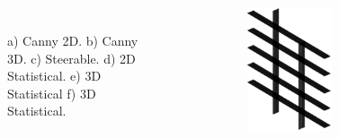 \documentclass[9pt]{beamer}
\begin{document}
\begin{frame}
\begin{columns}
\begin{figure}
\begin{tabular}{c c  c }
\end{tabular}
\caption{ a) Canny 2D. b) Canny 3D. c) Steerable. d) 2D Statistical. e) 3D Statistical  f) 3D Statistical.}
\end{figure}
\vspace{-2cm}
\begin{figure}
\includegraphics[width=0.6\textwidth]{multiidealrot.eps}
\end{figure}
\end{columns}
\end{frame}
\end{document}
